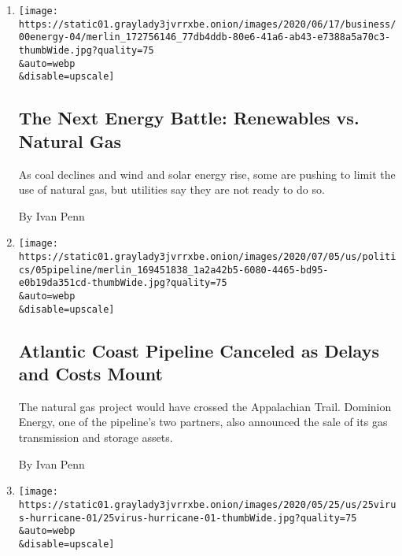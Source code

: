 \begin{enumerate}
\def\labelenumi{\arabic{enumi}.}
\item
  \href{/2020/07/06/business/energy-environment/renewable-energy-natural-gas.html}{}

  \texttt{[image: https://static01.graylady3jvrrxbe.onion/images/2020/06/17/business/00energy-04/merlin\_172756146\_77db4ddb-80e6-41a6-ab43-e7388a5a70c3-thumbWide.jpg?quality=75\\\&auto=webp\\\&disable=upscale]}

  \hypertarget{the-next-energy-battle-renewables-vs-natural-gas}{%
  \subsection{The Next Energy Battle: Renewables vs. Natural
  Gas}\label{the-next-energy-battle-renewables-vs-natural-gas}}

  As coal declines and wind and solar energy rise, some are pushing to
  limit the use of natural gas, but utilities say they are not ready to
  do so.

  By Ivan Penn
\item
  \href{/2020/07/05/business/atlantic-coast-pipeline-cancel-dominion-energy-berkshire-hathaway.html}{}

  \texttt{[image: https://static01.graylady3jvrrxbe.onion/images/2020/07/05/us/politics/05pipeline/merlin\_169451838\_1a2a42b5-6080-4465-bd95-e0b19da351cd-thumbWide.jpg?quality=75\\\&auto=webp\\\&disable=upscale]}

  \hypertarget{atlantic-coast-pipeline-canceled-as-delays-and-costs-mount}{%
  \subsection{Atlantic Coast Pipeline Canceled as Delays and Costs
  Mount}\label{atlantic-coast-pipeline-canceled-as-delays-and-costs-mount}}

  The natural gas project would have crossed the Appalachian Trail.
  Dominion Energy, one of the pipeline's two partners, also announced
  the sale of its gas transmission and storage assets.

  By Ivan Penn
\item
  \href{/2020/05/24/us/hurricane-pandemic-coronavirus-florida.html}{}

  \texttt{[image: https://static01.graylady3jvrrxbe.onion/images/2020/05/25/us/25virus-hurricane-01/25virus-hurricane-01-thumbWide.jpg?quality=75\\\&auto=webp\\\&disable=upscale]}

  \hypertarget{what-happens-if-a-hurricane-hits-during-the-pandemic}{%
}
\end{enumerate}
